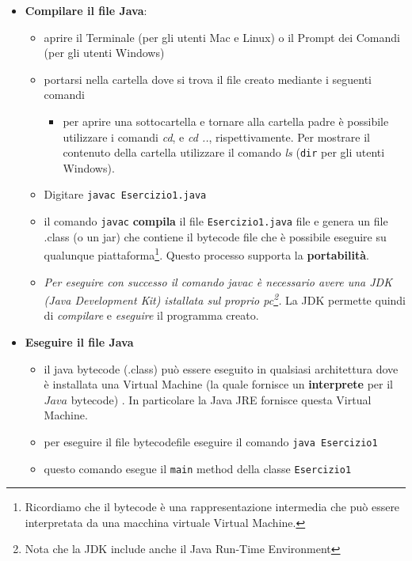 \documentclass{article}
\theoremstyle{definition}
\begin{document}
\begin{itemize}
\item \textbf{Compilare il file Java}:
\begin{itemize}
\item aprire il Terminale (per gli utenti Mac e Linux) o il Prompt dei Comandi (per gli utenti Windows)
\item portarsi nella cartella dove si trova il file creato mediante i seguenti comandi
\begin{itemize}
\item per aprire una sottocartella e tornare alla cartella padre \`e possibile utilizzare i  comandi \emph{cd}, e \emph{cd ..}, rispettivamente. Per mostrare il contenuto della cartella utilizzare  il comando \emph{ls} (\texttt{dir} per gli utenti Windows).
\end{itemize}
\item Digitare \texttt{javac Esercizio1.java}
\item il comando \texttt{javac}  \textbf{compila} il file \texttt{Esercizio1.java} file e genera un file .class (o un jar) che contiene il bytecode file che \`e possibile eseguire su qualunque piattaforma\footnote{Ricordiamo che il bytecode \`e una rappresentazione intermedia che pu\`o essere interpretata da una macchina virtuale Virtual Machine.}. Questo processo supporta la  \textbf{portabilit\`a}. 
\item \emph{Per eseguire con successo il comando \emph{javac} \`e necessario avere una JDK (Java Development Kit) istallata sul proprio pc\footnote{Nota che la JDK include anche il Java Run-Time Environment}.} La JDK permette quindi di  \emph{compilare} e \emph{eseguire} il programma creato.
\end{itemize}
\end{itemize}

\begin{itemize}
\item \textbf{Eseguire il file Java}
\begin{itemize}
\item il java bytecode (.class) pu\`o essere eseguito in qualsiasi architettura dove \`e installata una Virtual Machine (la quale fornisce un  \textbf{interprete} per il $Java$ bytecode) . In particolare la Java JRE fornisce questa Virtual Machine.
\item per eseguire il file bytecodefile eseguire il comando \texttt{java Esercizio1}
\item questo comando esegue il   \texttt{main} method della classe \texttt{Esercizio1}
\end{itemize}
\end{itemize}
\end{document}
